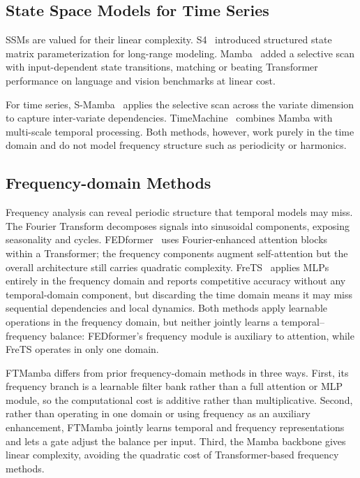 \documentclass[electronics,article,submit,pdftex,moreauthors]{Definitions/mdpi}
\begin{document}
\subsection{State Space Models for Time Series}

SSMs are valued for their linear complexity. S4~\cite{ref15} introduced structured state matrix parameterization for long-range modeling. Mamba~\cite{ref10} added a selective scan with input-dependent state transitions, matching or beating Transformer performance on language and vision benchmarks at linear cost.

For time series, S-Mamba~\cite{ref11} applies the selective scan across the variate dimension to capture inter-variate dependencies. TimeMachine~\cite{ref12} combines Mamba with multi-scale temporal processing. Both methods, however, work purely in the time domain and do not model frequency structure such as periodicity or harmonics.

\subsection{Frequency-domain Methods}

Frequency analysis can reveal periodic structure that temporal models may miss. The Fourier Transform decomposes signals into sinusoidal components, exposing seasonality and cycles. FEDformer~\cite{ref7} uses Fourier-enhanced attention blocks within a Transformer; the frequency components augment self-attention but the overall architecture still carries quadratic complexity. FreTS~\cite{ref16} applies MLPs entirely in the frequency domain and reports competitive accuracy without any temporal-domain component, but discarding the time domain means it may miss sequential dependencies and local dynamics. Both methods apply learnable operations in the frequency domain, but neither jointly learns a temporal--frequency balance: FEDformer's frequency module is auxiliary to attention, while FreTS operates in only one domain.

FTMamba differs from prior frequency-domain methods in three ways. First, its frequency branch is a learnable filter bank rather than a full attention or MLP module, so the computational cost is additive rather than multiplicative. Second, rather than operating in one domain or using frequency as an auxiliary enhancement, FTMamba jointly learns temporal and frequency representations and lets a gate adjust the balance per input. Third, the Mamba backbone gives linear complexity, avoiding the quadratic cost of Transformer-based frequency methods.
\end{document}
